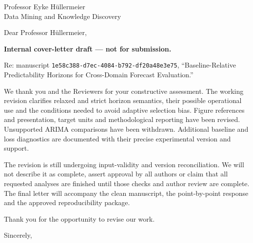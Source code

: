 \documentclass[11pt,a4paper]{letter}
\begin{document}
\begin{letter}{Professor Eyke H\"ullermeier\\Data Mining and Knowledge Discovery}
\opening{Dear Professor H\"ullermeier,}
\textbf{Internal cover-letter draft --- not for submission.}

Re: manuscript \texttt{1e58c388-d7ec-4084-b792-df20a48e3e75},
``Baseline-Relative Predictability Horizons for Cross-Domain Forecast Evaluation.''

We thank you and the Reviewers for your constructive assessment. The working
revision clarifies relaxed and strict horizon semantics, their possible
operational use and the conditions needed to avoid adaptive selection bias.
Figure references and presentation, target units and methodological reporting
have been revised. Unsupported ARIMA comparisons have been withdrawn.
Additional baseline and loss diagnostics are documented with their precise
experimental version and support.

The revision is still undergoing input-validity and version reconciliation.
We will not describe it as complete, assert approval by all authors or claim
that all requested analyses are finished until those checks and author review
are complete. The final letter will accompany the clean manuscript, the
point-by-point response and the approved reproducibility package.

Thank you for the opportunity to revise our work.
\closing{Sincerely,}
\end{letter}
\end{document}
